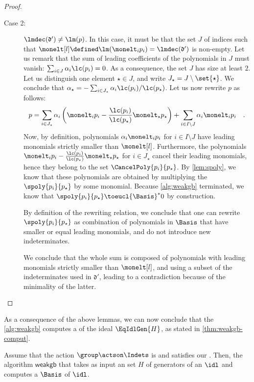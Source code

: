 \begin{proof}
\begin{description}
    \item[Case 2:] $\lmdec(\mathfrak{d}') \neq \lm(p)$.
      In this case, it must be that the set $J$ of indices such that
      $\monelt[l] \defined \lm(\monelt_i p_i) = \lmdec(\mathfrak{d}')$ is non-empty.
      Let us remark that 
      the sum of leading coefficients 
      of the polynomials in $J$ must vanish: $\sum_{i \in J} \alpha_i \lc(p_i) = 0$.
      As a consequence, the set $J$ has size at least $2$.
      Let us distinguish one element $\star \in J$, and 
      write $J_\star = J \setminus \set{\star}$.
      We conclude that 
      $\alpha_\star = - \sum_{i \in J_\star} \alpha_i \lc(p_i) / \lc(p_\star)$.
      Let us now rewrite $p$ as follows:
      \begin{equation}
        p = \sum_{i \in J_\star} \alpha_i 
        \left(\monelt_i p_i - \frac{\lc(p_i)}{\lc(p_\star)} \monelt_\star p_\star\right)
        + \sum_{i \in I \setminus J} \alpha_i \monelt_i p_i
        \quad .
      \end{equation}
      Now, by definition,
      polynomials $\alpha_i \monelt_i p_i$ for $i \in I \setminus J$ have 
      leading monomials
      strictly smaller than $\monelt[l]$.
      Furthermore,
      the polynomials
      $\monelt_i p_i - \frac{\lc(p_i)}{\lc(p_\star)} \monelt_\star p_\star$ for $i \in J_\star$
      cancel their leading monomials, hence they belong
      to the set $\CancelPoly{p_i}{p_\star}$.
      By \cref{lem:spoly}, we know that these polynomials are obtained by
      multiplying the  $\spoly{p_i}{p_\star}$ by some monomial.
      Because \cref{alg:weakgb} terminated, we know that 
      $\spoly{p_i}{p_\star} \toeucl{\Basis}^* 0$ by construction.

      By definition of the rewriting relation, we conclude that one can rewrite
      $\spoly{p_i}{p_\star}$ as combination of polynomials in $\Basis$ that
      have smaller or equal leading monomials, and do not introduce new
      indeterminates.

      We conclude that
      the whole sum is composed of polynomials with leading monomials 
      strictly smaller than $\monelt[l]$, and using a subset of the indeterminates
      used in $\mathfrak{d}'$, leading to a contradiction
      because of the minimality of the latter. 
      \qedhere
  \end{description}
\end{proof}

As a consequence of the above lemmas, we can now conclude that the 
\cref{alg:weakgb} computes a  of the
ideal $\EqIdlGen{H}$, as stated in \cref{thm:weakgb-comput}.

\begin{theorem}
  \label{thm:weakgb-comput}
  Assume that the action $\group \actson \Indets$
  is 
  and satisfies our .
  Then, the algorithm $\mathsf{weakgb}$ that takes as input an  set $H$ of generators of an
   $\idl$ and computes a  $\Basis$ of $\idl$.
\end{theorem}
